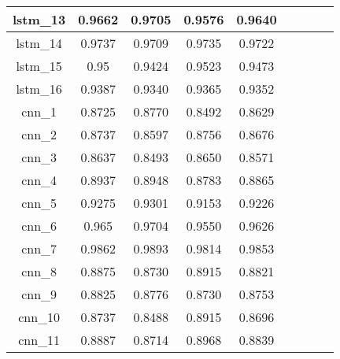 \begin{table}[p]
\begin{tabular} {|c|c|c|c|c|c|c|c|c| }
        lstm\_13 & 0.9662                       & 0.9705    & 0.9576 & 0.9640 \\ \hline
        lstm\_14 & 0.9737                       & 0.9709    & 0.9735 & 0.9722 \\ \hline
        lstm\_15 & 0.95                         & 0.9424    & 0.9523 & 0.9473 \\ \hline
        lstm\_16 & 0.9387                       & 0.9340    & 0.9365 & 0.9352 \\ \hline
        cnn\_1   & 0.8725                       & 0.8770    & 0.8492 & 0.8629 \\ \hline
        cnn\_2   & 0.8737                       & 0.8597    & 0.8756 & 0.8676 \\ \hline
        cnn\_3   & 0.8637                       & 0.8493    & 0.8650 & 0.8571 \\ \hline
        cnn\_4   & 0.8937                       & 0.8948    & 0.8783 & 0.8865 \\ \hline
        cnn\_5   & 0.9275                       & 0.9301    & 0.9153 & 0.9226 \\ \hline
        cnn\_6   & 0.965                        & 0.9704    & 0.9550 & 0.9626 \\ \hline
        cnn\_7   & 0.9862                       & 0.9893    & 0.9814 & 0.9853 \\ \hline
        cnn\_8   & 0.8875                       & 0.8730    & 0.8915 & 0.8821 \\ \hline
        cnn\_9   & 0.8825                       & 0.8776    & 0.8730 & 0.8753 \\ \hline
        cnn\_10  & 0.8737                       & 0.8488    & 0.8915 & 0.8696 \\ \hline
        cnn\_11  & 0.8887                       & 0.8714    & 0.8968 & 0.8839 \\ \hline
    \end{tabular}
\end{table}


